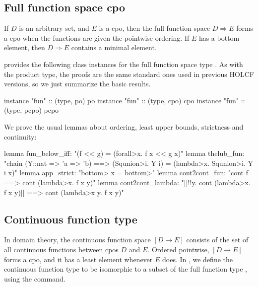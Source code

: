 \subsection{Full function space cpo}
\label{sec:holcf-fun}

If $D$ is an arbitrary set, and $E$ is a cpo, then the full function space $D \Rightarrow E$ forms a cpo when the functions are given the pointwise ordering. If $E$ has a bottom element, then $D \Rightarrow E$ contains a minimal element.

 provides the following class instances for the full function space type . As with the product type, the proofs are the same standard ones used in previous HOLCF versions, so we just summarize the basic results.

\begin{isacodes}
instance "fun" :: (type, po) po
instance "fun" :: (type, cpo) cpo
instance "fun" :: (type, pcpo) pcpo
\end{isacodes}

\noindent
We prove the usual lemmas about ordering, least upper bounds, strictness and continuity:

\begin{isacodes}
lemma fun_below_iff: "(f << g) = (\<forall>x. f x << g x)"
lemma thelub_fun: "chain (Y::nat => 'a => 'b) ==> (\<Squnion>i. Y i) = (\<lambda>x. \<Squnion>i. Y i x)"
lemma app_strict: "\<bottom> x = \<bottom>"
lemma cont2cont_fun: "cont f ==> cont (\<lambda>x. f x y)"
lemma cont2cont_lambda: "[|!!y. cont (\<lambda>x. f x y)|] ==> cont (\<lambda>x y. f x y)"
\end{isacodes}


\subsection{Continuous function type}
\label{sec:holcf-cfun}

In domain theory, the continuous function space $[D \to E]$ consists of the set of all continuous functions between cpos $D$ and $E$. Ordered pointwise, $[D \to E]$ forms a cpo, and it has a least element whenever $E$ does. In , we define the continuous function type  to be isomorphic to a subset of the full function type , using the  command.

